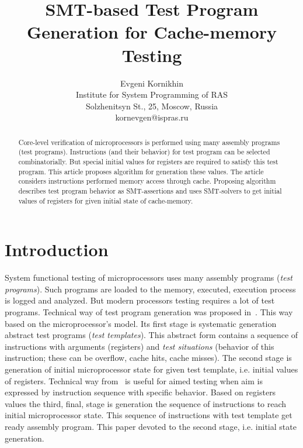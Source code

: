 \documentclass[times, 10pt,twocolumn]{article}
\begin{document}
\title{SMT-based Test Program Generation for Cache-memory Testing}

\author{Evgeni Kornikhin\\
Institute for System Programming of RAS\\ Solzhenitsyn St., 25, Moscow, Russia\\ kornevgen@ispras.ru\\
}

\maketitle
\thispagestyle{empty}

\begin{abstract}
Core-level verification of microprocessors is performed using 
many assembly programs (test programs). Instructions (and their behavior) for test program can be selected combinatorially. But special initial values for registers are required to satisfy this test program. This article proposes algorithm for generation these values. The article considers instructions performed memory access through cache. Proposing algorithm describes test program behavior as SMT-assertions and uses SMT-solvers to get initial values of registers for given initial state of cache-memory.
\end{abstract}



\section{Introduction}

System functional testing of microprocessors uses many assembly
programs (\emph{test programs}). Such programs are loaded to the
memory, executed, execution process is logged and analyzed. But
modern processors testing requires a lot of test programs. Technical
way of test program generation was proposed in~\cite{kamkin}. This
way based on the microprocessor's model. Its first stage is
systematic generation abstract test programs (\emph{test
templates}). This abstract form contains a sequence of instructions
with arguments (registers) and \emph{test situations} (behavior of
this instruction; these can be overflow, cache hits, cache misses).
The second stage is generation of initial microprocessor state for
given test template, i.e. initial values of registers. Technical way
from~\cite{kamkin} is useful for aimed testing when aim is expressed
by instruction sequence with specific behavior. Based on registers
values the third, final, stage is generation the sequence of
instructions to reach initial microprocessor state. This sequence of
instructions with test template get ready assembly program. This
paper devoted to the second stage, i.e. initial state generation.
\end{document}

